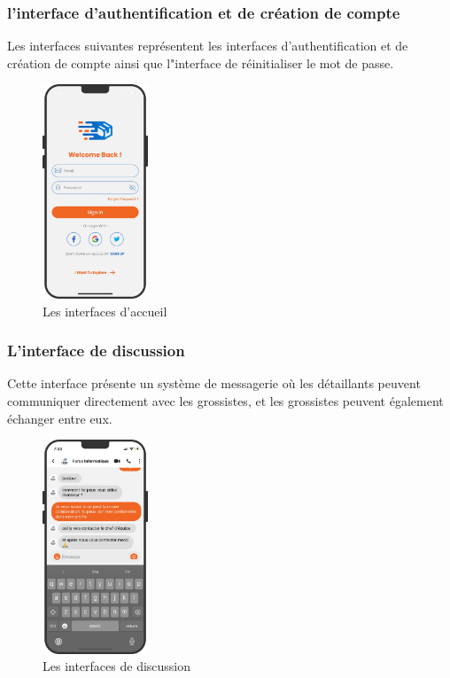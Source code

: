 \documentclass[edit,12pt,a4paper,ChapStyle,oneside,doubleinterligne]{report}
\begin{document}
\subsubsection{l'interface d'authentification et de création de compte}
Les interfaces suivantes représentent les interfaces d'authentification et de création de compte ainsi que l"interface de réinitialiser le mot de passe.
  \begin{figure} [H]
    \centering
    \includegraphics[width=0.28\textwidth]{images/app signin.png}
    \caption{Les interfaces d'accueil}
    \label{fig:colors}
\end{figure}

\subsubsection{L'interface de discussion}
Cette interface présente un système de messagerie où les détaillants peuvent communiquer directement avec les grossistes, et les grossistes peuvent également échanger entre eux.
  \begin{figure} [H]
    \centering
    \includegraphics[width=0.28\textwidth]{images/app discussiion.png}
    \caption{Les interfaces de discussion}
    \label{fig:colors}
\end{figure}
\end{document}
